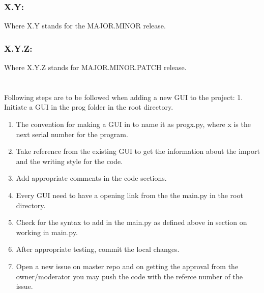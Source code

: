 \documentclass[letterpaper,10pt,english]{sphinxmanual}
\begin{document}
\subsubsection{X.Y:}
\label{\detokenize{developer:x-y}}
Where X.Y stands for the MAJOR.MINOR release.


\subsubsection{X.Y.Z:}
\label{\detokenize{developer:x-y-z}}
Where X.Y.Z stands for MAJOR.MINOR.PATCH release.


\section{}
\label{\detokenize{developer:faqs}}

Following steps are to be followed when adding a new GUI to the project:
1. Initiate a GUI in the prog folder in the root directory.
\begin{enumerate}
%
\setcounter{enumi}{1}
\item {} 
The convention for making a GUI in to name it as progx.py, where x is the next serial number for the program.

\item {} 
Take reference from the existing GUI to get the information about the import and the writing style for the code.

\item {} 
Add appropriate comments in the code sections.

\item {} 
Every GUI need to have a opening link from the the main.py in the root directory.

\item {} 
Check for the syntax to add in the main.py as defined above in section on working in main.py.

\item {} 
After appropriate testing, commit the local changes.

\item {} 
Open a new issue on master repo and on getting the approval from the owner/moderator you may push the code with the referce number of the issue.

\end{enumerate}

\end{document}
